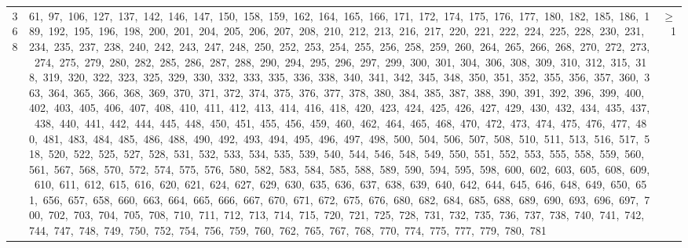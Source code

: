 \begin{longtable}{c|p{}|r}
368 & 61,\ 97,\ 106,\ 127,\ 137,\ 142,\ 146,\ 147,\ 150,\ 158,\ 159,\ 162,\ 164,\ 165,\ 166,\ 171,\ 172,\ 174,\ 175,\ 176,\ 177,\ 180,\ 182,\ 185,\ 186,\ 189,\ 192,\ 195,\ 196,\ 198,\ 200,\ 201,\ 204,\ 205,\ 206,\ 207,\ 208,\ 210,\ 212,\ 213,\ 216,\ 217,\ 220,\ 221,\ 222,\ 224,\ 225,\ 228,\ 230,\ 231,\ 234,\ 235,\ 237,\ 238,\ 240,\ 242,\ 243,\ 247,\ 248,\ 250,\ 252,\ 253,\ 254,\ 255,\ 256,\ 258,\ 259,\ 260,\ 264,\ 265,\ 266,\ 268,\ 270,\ 272,\ 273,\ 274,\ 275,\ 279,\ 280,\ 282,\ 285,\ 286,\ 287,\ 288,\ 290,\ 294,\ 295,\ 296,\ 297,\ 299,\ 300,\ 301,\ 304,\ 306,\ 308,\ 309,\ 310,\ 312,\ 315,\ 318,\ 319,\ 320,\ 322,\ 323,\ 325,\ 329,\ 330,\ 332,\ 333,\ 335,\ 336,\ 338,\ 340,\ 341,\ 342,\ 345,\ 348,\ 350,\ 351,\ 352,\ 355,\ 356,\ 357,\ 360,\ 363,\ 364,\ 365,\ 366,\ 368,\ 369,\ 370,\ 371,\ 372,\ 374,\ 375,\ 376,\ 377,\ 378,\ 380,\ 384,\ 385,\ 387,\ 388,\ 390,\ 391,\ 392,\ 396,\ 399,\ 400,\ 402,\ 403,\ 405,\ 406,\ 407,\ 408,\ 410,\ 411,\ 412,\ 413,\ 414,\ 416,\ 418,\ 420,\ 423,\ 424,\ 425,\ 426,\ 427,\ 429,\ 430,\ 432,\ 434,\ 435,\ 437,\ 438,\ 440,\ 441,\ 442,\ 444,\ 445,\ 448,\ 450,\ 451,\ 455,\ 456,\ 459,\ 460,\ 462,\ 464,\ 465,\ 468,\ 470,\ 472,\ 473,\ 474,\ 475,\ 476,\ 477,\ 480,\ 481,\ 483,\ 484,\ 485,\ 486,\ 488,\ 490,\ 492,\ 493,\ 494,\ 495,\ 496,\ 497,\ 498,\ 500,\ 504,\ 506,\ 507,\ 508,\ 510,\ 511,\ 513,\ 516,\ 517,\ 518,\ 520,\ 522,\ 525,\ 527,\ 528,\ 531,\ 532,\ 533,\ 534,\ 535,\ 539,\ 540,\ 544,\ 546,\ 548,\ 549,\ 550,\ 551,\ 552,\ 553,\ 555,\ 558,\ 559,\ 560,\ 561,\ 567,\ 568,\ 570,\ 572,\ 574,\ 575,\ 576,\ 580,\ 582,\ 583,\ 584,\ 585,\ 588,\ 589,\ 590,\ 594,\ 595,\ 598,\ 600,\ 602,\ 603,\ 605,\ 608,\ 609,\ 610,\ 611,\ 612,\ 615,\ 616,\ 620,\ 621,\ 624,\ 627,\ 629,\ 630,\ 635,\ 636,\ 637,\ 638,\ 639,\ 640,\ 642,\ 644,\ 645,\ 646,\ 648,\ 649,\ 650,\ 651,\ 656,\ 657,\ 658,\ 660,\ 663,\ 664,\ 665,\ 666,\ 667,\ 670,\ 671,\ 672,\ 675,\ 676,\ 680,\ 682,\ 684,\ 685,\ 688,\ 689,\ 690,\ 693,\ 696,\ 697,\ 700,\ 702,\ 703,\ 704,\ 705,\ 708,\ 710,\ 711,\ 712,\ 713,\ 714,\ 715,\ 720,\ 721,\ 725,\ 728,\ 731,\ 732,\ 735,\ 736,\ 737,\ 738,\ 740,\ 741,\ 742,\ 744,\ 747,\ 748,\ 749,\ 750,\ 752,\ 754,\ 756,\ 759,\ 760,\ 762,\ 765,\ 767,\ 768,\ 770,\ 774,\ 775,\ 777,\ 779,\ 780,\ 781 & $\ge$ 1 \\

\end{longtable}
